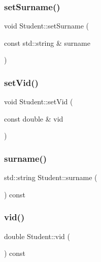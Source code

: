 \subsubsection{\texorpdfstring{setSurname()}{setSurname()}}
{\footnotesize\ttfamily void Student\+::set\+Surname (\begin{DoxyParamCaption}\item[{const std\+::string \&}]{surname }\end{DoxyParamCaption})\hspace{0.3cm}{\ttfamily [inline]}}

\mbox{\label{class_student_a4834bbde9c9dffa6f5db82f1f65367fe}} 
\subsubsection{\texorpdfstring{setVid()}{setVid()}}
{\footnotesize\ttfamily void Student\+::set\+Vid (\begin{DoxyParamCaption}\item[{const double \&}]{vid }\end{DoxyParamCaption})\hspace{0.3cm}{\ttfamily [inline]}}

\mbox{\label{class_student_addd918dab403a4181f4761b53148855f}} 
\subsubsection{\texorpdfstring{surname()}{surname()}}
{\footnotesize\ttfamily std\+::string Student\+::surname (\begin{DoxyParamCaption}{ }\end{DoxyParamCaption}) const\hspace{0.3cm}{\ttfamily [inline]}}

\mbox{\label{class_student_aadb9af906a6e62c80ae87496b718ba01}} 
\subsubsection{\texorpdfstring{vid()}{vid()}}
{\footnotesize\ttfamily double Student\+::vid (\begin{DoxyParamCaption}{ }\end{DoxyParamCaption}) const\hspace{0.3cm}{\ttfamily [inline]}}



